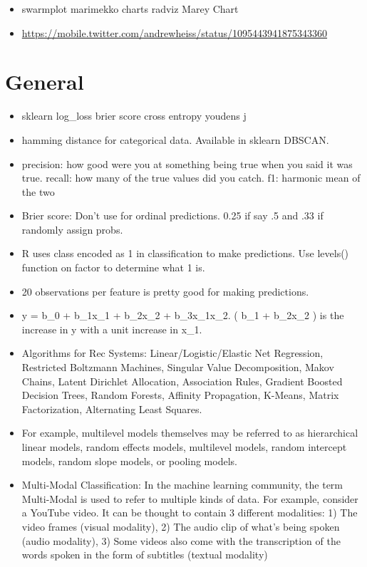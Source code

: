 \documentclass[]{book}
\begin{document}
\begin{itemize}
\item
  swarmplot \textbar{} marimekko charts \textbar{} radviz \textbar{} Marey Chart
\item
  \url{https://mobile.twitter.com/andrewheiss/status/1095443941875343360}
\end{itemize}

\hypertarget{general-2}{%
\section{General}\label{general-2}}

\begin{itemize}
\item
  sklearn log\_loss \textbar{} brier score\textbar{} cross entropy \textbar{} youdens j
\item
  hamming distance for categorical data. Available in sklearn DBSCAN.
\item
  precision: how good were you at something being true when you said it was true. recall: how many of the true values did you catch. f1: harmonic mean of the two
\item
  Brier score: Don't use for ordinal predictions. 0.25 if say .5 and .33 if randomly assign probs.
\item
  R uses class encoded as 1 in classification to make predictions. Use levels() function on factor to determine what 1 is.
\item
  20 observations per feature is pretty good for making predictions.
\item
  y = b\_0 + b\_1x\_1 + b\_2x\_2 + b\_3x\_1x\_2. ( b\_1 + b\_2x\_2 ) is the increase in y with a unit increase in x\_1.
\item
  Algorithms for Rec Systems: Linear/Logistic/Elastic Net Regression, Restricted Boltzmann Machines, Singular Value Decomposition, Makov Chains, Latent Dirichlet Allocation, Association Rules, Gradient Boosted Decision Trees, Random Forests, Affinity Propagation, K-Means, Matrix Factorization, Alternating Least Squares.
\item
  For example, multilevel models themselves may be referred to as hierarchical linear models, random effects models, multilevel models, random intercept models, random slope models, or pooling models.
\item
  Multi-Modal Classification: In the machine learning community, the term Multi-Modal is used to refer to multiple kinds of data. For example, consider a YouTube video. It can be thought to contain 3 different modalities: 1) The video frames (visual modality), 2) The audio clip of what's being spoken (audio modality), 3) Some videos also come with the transcription of the words spoken in the form of subtitles (textual modality)

\end{itemize}
\end{document}
